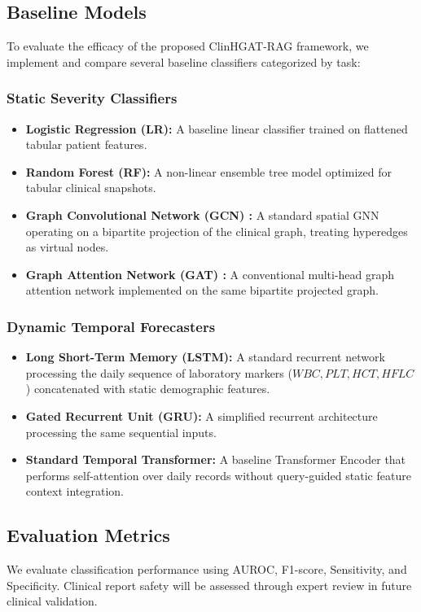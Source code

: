 \documentclass[conference]{IEEEtran}
\begin{document}
\subsection{Baseline Models}
To evaluate the efficacy of the proposed ClinHGAT-RAG framework, we implement and compare several baseline classifiers categorized by task:

\subsubsection{Static Severity Classifiers}
\begin{itemize}
    \item \textbf{Logistic Regression (LR):} A baseline linear classifier trained on flattened tabular patient features.
    \item \textbf{Random Forest (RF):} A non-linear ensemble tree model optimized for tabular clinical snapshots.
    \item \textbf{Graph Convolutional Network (GCN) \cite{kipf2017}:} A standard spatial GNN operating on a bipartite projection of the clinical graph, treating hyperedges as virtual nodes.
    \item \textbf{Graph Attention Network (GAT) \cite{velickovic2018}:} A conventional multi-head graph attention network implemented on the same bipartite projected graph.
\end{itemize}

\subsubsection{Dynamic Temporal Forecasters}
\begin{itemize}
    \item \textbf{Long Short-Term Memory (LSTM):} A standard recurrent network processing the daily sequence of laboratory markers ($WBC, PLT, HCT, HFLC$) concatenated with static demographic features.
    \item \textbf{Gated Recurrent Unit (GRU):} A simplified recurrent architecture processing the same sequential inputs.
    \item \textbf{Standard Temporal Transformer:} A baseline Transformer Encoder that performs self-attention over daily records without query-guided static feature context integration.
\end{itemize}

\subsection{Evaluation Metrics}
We evaluate classification performance using AUROC, F1-score, Sensitivity, and Specificity. Clinical report safety will be assessed through expert review in future clinical validation.
\end{document}
